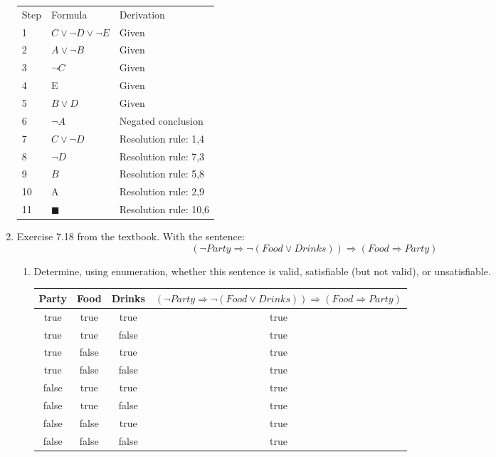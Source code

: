 \documentclass[paper=a4, fontsize=11pt]{scrartcl} %
\numberwithin{equation}{section} %
\numberwithin{figure}{section} %
\numberwithin{table}{section} %
\begin{document}
\begin{enumerate}
	\begin{tabular}{lll}
	Step & Formula                     & Derivation         \\
	1    & $C \vee \neg D \vee \neg E$ & Given              \\
	2    & $A \vee \neg B$             & Given              \\
	3    & $\neg C$                    & Given              \\
	4    & E                           & Given              \\
	5    & $B \vee D$                  & Given              \\
	6    & $\neg A$                    & Negated conclusion \\
	\hline
	7    & $C \vee \neg D$             & Resolution rule: 1,4\\
	8    & $\neg D$                    & Resolution rule: 7,3\\
	9    & $B$                         & Resolution rule: 5,8\\
	10   & A                           & Resolution rule: 2,9\\
	11   & $\blacksquare$              & Resolution rule: 10,6\\               
	\end{tabular}

	\item
	Exercise 7.18 from the textbook. With the sentence:
	$$(\neg Party \Rightarrow \neg(Food \vee Drinks)) \Rightarrow (Food \Rightarrow Party)$$

	\begin{enumerate}
		\item
		Determine, using enumeration, whether this sentence is valid, satisfiable (but not valid),
		or unsatisfiable.

		\begin{tabular*}{\textwidth}{c c c c}
			Party & Food & Drinks & $(\neg Party \Rightarrow \neg(Food \vee Drinks)) \Rightarrow (Food \Rightarrow Party)$ \\
			\hline
			true	& true	& true	& true		\\
			true	& true	& false	& true 		\\
			true	& false	& true	& true		\\
			true	& false	& false	& true		\\
			false	& true	& true	& true		\\
			false	& true	& false	& true		\\
			false	& false	& true	& true		\\
			false	& false	& false	& true		\\
			

\end{tabular*}
\end{enumerate}
\end{enumerate}
\end{document}
